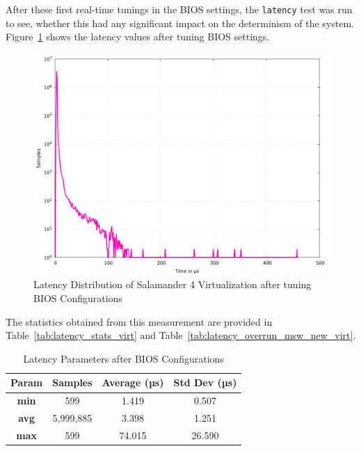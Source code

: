 \documentclass[MMR,Master,english]{twbook}
\begin{document}
\noindent After these first real-time tunings in the BIOS settings, the \texttt{latency} test was run to see, whether this had any significant impact on the determinism of the system. Figure~\ref{fig:gnuplot_max_latency_taskset} shows the latency values after tuning BIOS settings.

\begin{figure}[H]
	\centering
	\includegraphics[width=0.7\columnwidth]{masterthesis-documentation/docs/sigmatek/xenomai/2taskset/gnuplot_max_latency_taskset.png}
	\caption[Latency Distribution of Salamander 4 after BIOS Configurations]{Latency Distribution of Salamander 4 Virtualization after tuning BIOS Configurations}
	\label{fig:gnuplot_max_latency_taskset}
\end{figure}

\noindent The statistics obtained from this measurement are provided in Table~\ref{tab:latency_stats_virt} and Table~\ref{tab:latency_overrun_msw_new_virt}.

\begin{table}[H]
	\centering
	\caption{Latency Parameters after BIOS Configurations}
	\label{tab:latency_stats_virt_bios}
	\begin{tabular}{|c|c|c|c|}
		\hline
		\textbf{Param} & \textbf{Samples} & \textbf{Average (µs)} & \textbf{Std Dev (µs)} \\ \hline
		\textbf{min}   & 599              & 1.419                 & 0.507                 \\ \hline
		\textbf{avg}   & 5,999,885        & 3.398                 & 1.251                 \\ \hline
		\textbf{max}   & 599              & 74.015                & 26.590                \\ \hline
	\end{tabular}
\end{table}
\end{document}
